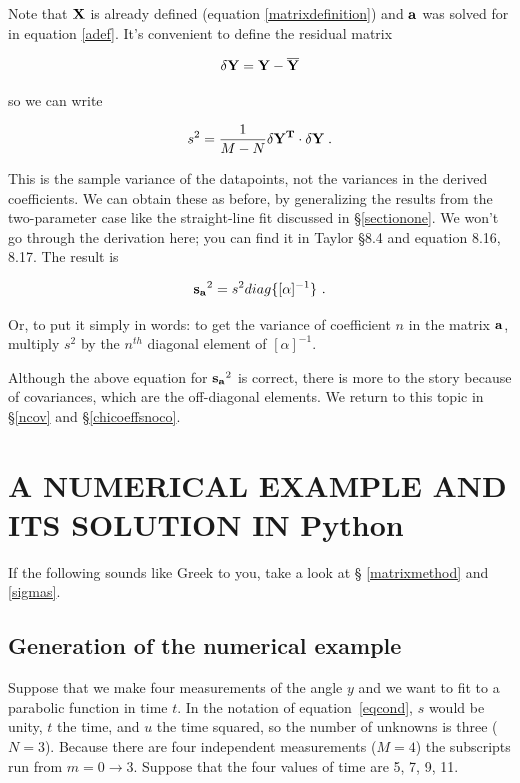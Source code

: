 \documentclass[psfig,preprint]{aastex}
\begin{document}
\noindent Note that ${\bf X}$ is already defined (equation
\ref{matrixdefinition}) and ${\bf a}$ was solved for in equation
\ref{adef}. It's convenient to define the residual matrix

\begin{equation}
{\bf \delta Y } = {\bf Y - \overline{ Y}}
\end{equation}

\noindent so we can write

\begin{equation} \label{samplevariancetwo}
s^2 = {1 \over M - N} {\bf \delta Y^T \cdot \delta Y} \; . 
\end{equation}

	This is the sample variance of the datapoints, not the variances
in the derived coefficients. We can obtain these as before, by
generalizing the results from the two-parameter case like the
straight-line fit discussed in \S \ref{sectionone}. We won't go through
the derivation here; you can find it in Taylor \S 8.4 and equation 8.16,
8.17. The result is

\begin{equation} \label{coeffvarianceone}
{\bf s_a}^2 = s^2 diag \{[\alpha]^{-1} \} \ .
\end{equation}

\noindent Or, to put it simply in words: to get the variance of 
coefficient $n$ in the matrix ${\bf a}$, multiply $s^2$ by the $n^{th}$
diagonal element of $[\alpha]^{-1}$. 

	Although the above equation for ${\bf s_a}^2$ is correct, there
is more to the story because of covariances, which are the off-diagonal
elements. We return to this topic in \S \ref{ncov} and \S \ref{chicoeffsnoco}. 

\section{A NUMERICAL EXAMPLE AND ITS SOLUTION IN Python} \label{numexample}

	If the following sounds like Greek to you, take a look at \S
\ref{matrixmethod} and \ref{sigmas}.

\subsection{Generation of the numerical example}

	Suppose that we make four measurements of the angle $y$ and
we want to fit to a parabolic function in time $t$.  In the notation of
equation~\ref{eqcond}, $s$ would be unity, $t$ the time, and $u$ the
time squared, so the number of unknowns is three ($N=3$).  Because there
are four independent measurements ($M=4$) the subscripts run from $m = 0
\rightarrow 3$.  Suppose that the four values of time are 5, 7, 9, 11. 
\end{document}
